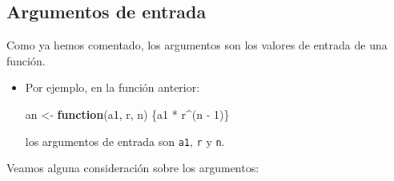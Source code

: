\documentclass[
]{book}
\newenvironment{Shaded}{\begin{snugshade}}{\end{snugshade}}
\newcommand{\ControlFlowTok}[1]{\textcolor[rgb]{0.13,0.29,0.53}{\textbf{#1}}}
\newcommand{\DecValTok}[1]{\textcolor[rgb]{0.00,0.00,0.81}{#1}}
\newcommand{\NormalTok}[1]{#1}
\newcommand{\OtherTok}[1]{\textcolor[rgb]{0.56,0.35,0.01}{#1}}
\newcommand{\SpecialCharTok}[1]{\textcolor[rgb]{0.00,0.00,0.00}{#1}}
\theoremstyle{break}
\begin{document}
\hypertarget{argumentos-de-entrada}{%
\subsection{Argumentos de entrada}\label{argumentos-de-entrada}}

Como ya hemos comentado, los
argumentos son los valores de entrada de una función.

\begin{itemize}
\item
  Por ejemplo, en la función anterior:

\begin{Shaded}
\begin{Highlighting}[]
\NormalTok{an }\OtherTok{\textless{}{-}} \ControlFlowTok{function}\NormalTok{(a1, r, n) \{a1 }\SpecialCharTok{*}\NormalTok{ r}\SpecialCharTok{\^{}}\NormalTok{(n }\SpecialCharTok{{-}} \DecValTok{1}\NormalTok{)\}}
\end{Highlighting}
\end{Shaded}

  los argumentos de entrada son \texttt{a1}, \texttt{r} y \texttt{n}.
\end{itemize}

Veamos alguna consideración sobre los argumentos:
\end{document}
